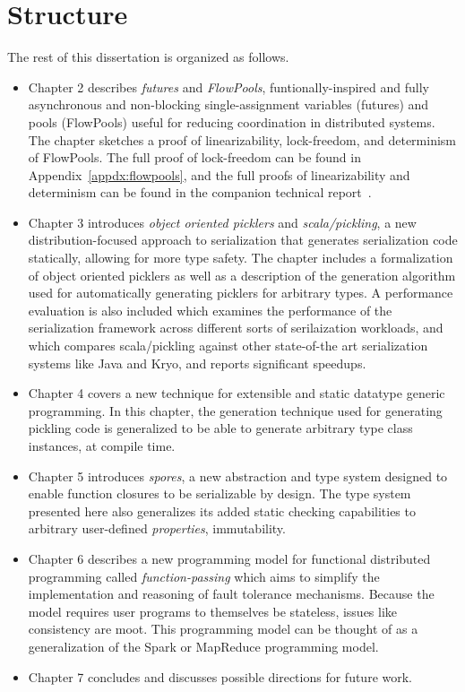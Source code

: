 \section{Structure}

The rest of this dissertation is organized as follows.

\begin{itemize}

	\item Chapter 2 describes {\em futures} and {\em FlowPools}, funtionally-inspired
	and fully asynchronous and non-blocking single-assignment variables (futures)
	and pools (FlowPools) useful for reducing coordination in distributed systems.
	The chapter sketches a proof of linearizability, lock-freedom, and determinism
	of FlowPools. The full proof of lock-freedom can be found in
	Appendix~\ref{appdx:flowpools}, and the full proofs of linearizability and
	determinism can be found in the companion technical report~\cite{Prokopec12}.

	\item Chapter 3 introduces {\em object oriented picklers} and {\em
	scala/pickling}, a new distribution-focused approach to serialization that
	generates serialization code statically, allowing for more type safety. The
	chapter includes a formalization of object oriented picklers as well as a
	description of the generation algorithm used for automatically generating
	picklers for arbitrary types. A performance evaluation is also included which
	examines the performance of the serialization framework across different sorts
	of serilaization workloads, and which compares scala/pickling against other
	state-of-the art serialization systems like Java and Kryo, and reports
	significant speedups.

	\item Chapter 4 covers a new technique for extensible and static datatype
	generic programming. In this chapter, the generation technique used for
	generating pickling code is generalized to be able to generate arbitrary type
	class instances, at compile time.

	\item Chapter 5 introduces {\em spores}, a new abstraction and type system
	designed to enable function closures to be serializable by design. The type
	system presented here also generalizes its added static checking capabilities
	to arbitrary user-defined {\em properties}, \eg immutability.

	\item Chapter 6 describes a new programming model for functional distributed
	programming called {\em function-passing} which aims to simplify the
	implementation and reasoning of fault tolerance mechanisms. Because the model
	requires user programs to themselves be stateless, issues like consistency are
	moot. This programming model can be thought of as a generalization of the Spark
	or MapReduce programming model.

	\item Chapter 7 concludes and discusses possible directions for future work.

\end{itemize}

